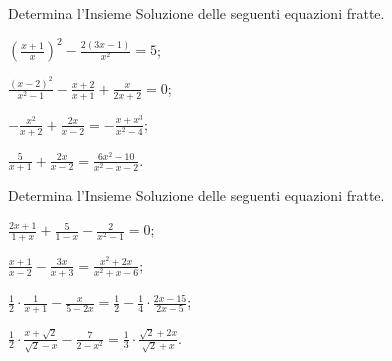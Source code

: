 \begin{esercizio}[\Ast]
 \label{ese:3.45}
Determina l'Insieme Soluzione delle seguenti equazioni fratte.
\begin{multicols}{2}
\begin{enumeratea}
\item $\left(\frac{x + 1}{x} \right)^{2}-\frac{2 (3 x-1)}{x^{2}} = 5$;
\item $\frac{(x-2)^{2}}{x^{2}-1}-\frac{x + 2}{x + 1} +\frac{x}{2 x + 2} = 0$;
\item $- \frac{x^{2}}{x + 2} + \frac{2 x}{x-2} =-\frac{x + x^{3}}{x^{2}-4}$;
\item $\frac{5}{x + 1} + \frac{2 x}{x-2} = \frac{6 x^{2}-10}{x^{2}-x-2}$.
\end{enumeratea}
\end{multicols}
\end{esercizio}

\begin{esercizio}[\Ast]
 \label{ese:3.46}
Determina l'Insieme Soluzione delle seguenti equazioni fratte.
\begin{multicols}{2}
\begin{enumeratea}
\item $\frac{2 x + 1}{1 + x} + \frac{5}{1-x}-\frac{2}{x^{2}-1}= 0$;
\item $\frac{x + 1}{x-2}-\frac{3 x}{x + 3} = \frac{x^{2} + 2 x}{x^{2} + x-6}$;
\item $\frac{1}{2}\cdot\frac{1}{x+1}-\frac{x}{5-2x} = \frac{1}{2}-\frac{1}{4}\cdot\frac{2x-15}{2x-5}$; %
\item $\frac{1}{2}\cdot\frac{x+\sqrt{2}}{\sqrt{2}-x}-\frac{7}{2-x^{2}} = \frac{1}{3}\cdot\frac{\sqrt{2}+2x}{\sqrt{2}+x}$.
\end{enumeratea}
\end{multicols}
\end{esercizio}


